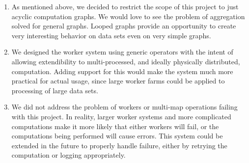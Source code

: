 \documentclass{article}
\begin{document}
\begin{enumerate}
\item As mentioned above, we decided to restrict the scope of this project to just
  acyclic computation graphs. We would love to see the problem of aggregation
  solved for general graphs. Looped graphs provide an opportunity to create
  very interesting behavior on data sets even on very simple graphs.
\item We designed the worker system using generic operators with the intent of
  allowing extendibility to multi-processed, and ideally physically distributed,
  computation. Adding support for this would make the system much more practical
  for actual usage, since large worker farms could be applied to processing of
  large data sets.
\item We did not address the problem of workers or multi-map operations failing
  with this project. In reality, larger worker systems and more complicated
  computations make it more likely that either workers will fail, or the computations
  being performed will cause errors. This system could be extended in the future
  to properly handle failure, either by retrying the computation or logging
  appropriately.
\end{enumerate}
\end{document}
